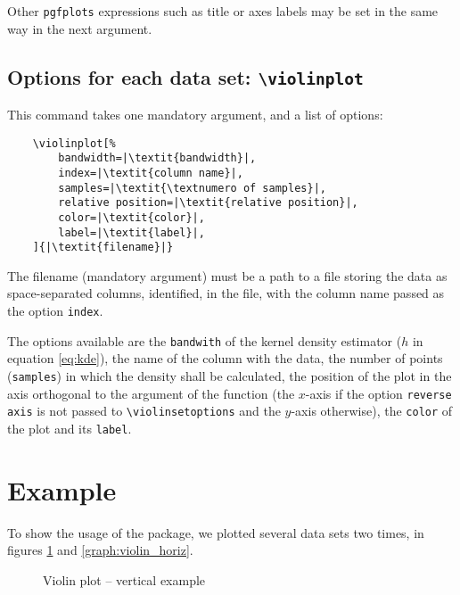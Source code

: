 \documentclass{article}
\begin{document}
Other \texttt{pgfplots} expressions such as title or axes labels may be set
in the same way in the next argument.

\subsection{Options for each data set: \texttt{{\textbackslash}violinplot}}

This command takes one mandatory argument, and a list of options:

\begin{verbatim}
	\violinplot[%
		bandwidth=|\textit{bandwidth}|,
		index=|\textit{column name}|,
		samples=|\textit{\textnumero of samples}|,
		relative position=|\textit{relative position}|,
		color=|\textit{color}|,
		label=|\textit{label}|,
	]{|\textit{filename}|}
\end{verbatim}

The filename (mandatory argument) must be a path to a file storing the data as
space-separated columns, identified, in the file, with the column name passed as
the option \texttt{index}.

The options available are the \texttt{bandwith} of the kernel density estimator
($h$ in equation \ref{eq:kde}), the name of the column with the data,
the number of points (\texttt{samples}) in which the density shall be
calculated, the position of the plot in the axis orthogonal to the argument
of the function (the $x$-axis if the option \texttt{reverse axis} is not
passed to \texttt{{\textbackslash}violinsetoptions} and the $y$-axis otherwise),
the \texttt{color} of the plot and its \texttt{label}.

\section{Example}

To show the usage of the package, we plotted several data sets two times, in
figures \ref{graph:violin_verti} and \ref{graph:violin_horiz}.

\begin{figure}[h]
	\centering
	\caption{Violin plot -- vertical example}
	\label{graph:violin_verti}
\end{figure}
\end{document}
